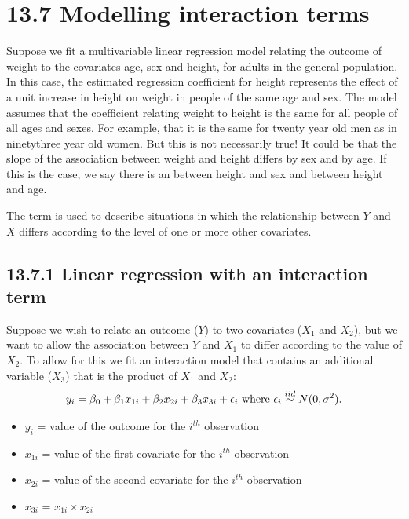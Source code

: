 \documentclass[letterpaper,10pt,english]{jupyterBook}
\begin{document}
\section{13.7  Modelling interaction terms}
\label{\detokenize{13.g. Linear Regression II:modelling-interaction-terms}}\label{\detokenize{13.g. Linear Regression II::doc}}
\sphinxAtStartPar
Suppose we fit a multivariable linear regression model relating the outcome of weight to the covariates age, sex and height, for adults in the general population. In this case, the estimated regression coefficient for height represents the effect of a unit increase in height on weight in people of the same age and sex. The model assumes that the coefficient relating weight to height is the same for all people of all ages and sexes. For example, that it is the same for twenty year old men as in ninety\sphinxhyphen{}three year old women. But this is not necessarily true! It could be that the slope of the association between weight and height differs by sex and by age. If this is the case, we say there is an  between height and sex and between height and age.

\sphinxAtStartPar
The term  is used to describe situations in which the relationship between \(Y\) and \(X\) differs according to the level of one or more other covariates.


\subsection{13.7.1 Linear regression with an interaction term}
\label{\detokenize{13.g. Linear Regression II:linear-regression-with-an-interaction-term}}
\sphinxAtStartPar
Suppose we wish to relate an outcome (\(Y\)) to two covariates (\(X_1\) and \(X_2\)), but we want to allow the association between \(Y\) and \(X_1\) to differ according to the value of \(X_2\). To allow for this we fit an interaction model that contains an additional variable (\(X_3\)) that is the product of \(X_1\) and \(X_2\):
\begin{equation*}
\begin{split}
y_i =  \beta_0 + \beta_1 x_{1i} + \beta_2 x_{2i} + \beta_3 x_{3i} + \epsilon_i \text{ where }  \epsilon_i \overset{\small{iid}}{\sim} N(0, \sigma^2).
\end{split}
\end{equation*}\begin{itemize}
\item {} 
\sphinxAtStartPar
\(y_i\) = value of the outcome for the \(i^{th}\) observation

\item {} 
\sphinxAtStartPar
\(x_{1i}\) = value of the first covariate for the \(i^{th}\) observation

\item {} 
\sphinxAtStartPar
\(x_{2i}\) =  value of the second covariate for the \(i^{th}\) observation

\item {} 
\sphinxAtStartPar
\(x_{3i}\) = \(x_{1i} \times x_{2i}\)

\end{itemize}
\end{document}
